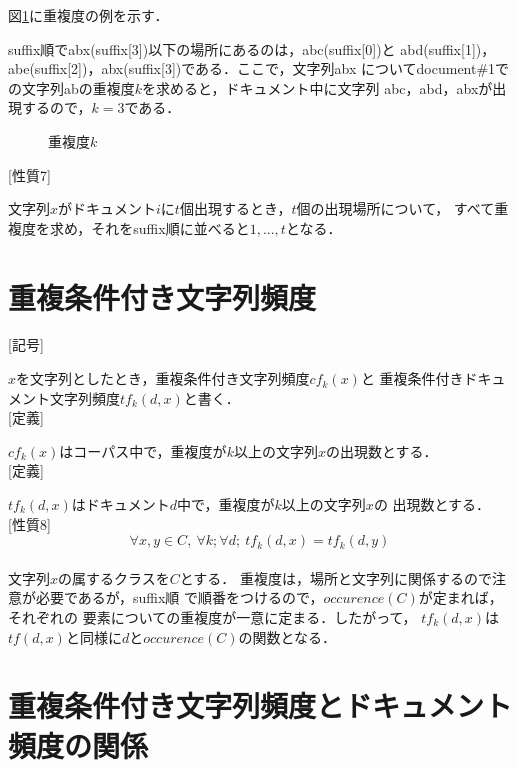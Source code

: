 図\ref{chofuku}に重複度の例を示す．\par
suffix順でabx(suffix[3])以下の場所にあるのは，abc(suffix[0])と
abd(suffix[1])，abe(suffix[2])，abx(suffix[3])である．ここで，文字列abx
についてdocument\#1での文字列abの重複度$k$を求めると，ドキュメント中に文字列
abc，abd，abxが出現するので，$k=3$である．\\

 \begin{figure}[htbp]
  \begin{center}
   \epsfxsize=10cm
   
   \caption{重複度$k$}
   \label{chofuku}
  \end{center}
 \end{figure}

[性質7]\par
文字列$x$がドキュメント$i$に$t$個出現するとき，$t$個の出現場所について，
すべて重複度を求め，それをsuffix順に並べると$1,...,t$となる．


\section{重複条件付き文字列頻度}

[記号]\par
$x$を文字列としたとき，重複条件付き文字列頻度$cf_k(x)$と
重複条件付きドキュメント文字列頻度$tf_k(d,x)$と書く．\\

[定義]\par
 $cf_k(x)$はコーパス中で，重複度が$k$以上の文字列$x$の出現数とする．\\

[定義]\par
 $tf_k(d,x)$はドキュメント$d$中で，重複度が$k$以上の文字列$x$の
出現数とする．\\

[性質8]
$$\forall x,y\in C,\ \forall k; \forall d; \ tf_k(d, x)=tf_k(d, y)$$\\

文字列$x$の属するクラスを$C$とする．
重複度は，場所と文字列に関係するので注意が必要であるが，suffix順
で順番をつけるので，$occurence(C)$が定まれば，それぞれの
要素についての重複度が一意に定まる．したがって，
$tf_k(d, x)$は$tf(d,x)$と同様に$d$と$occurence(C)$の関数となる．


\section{重複条件付き文字列頻度とドキュメント頻度の関係}

